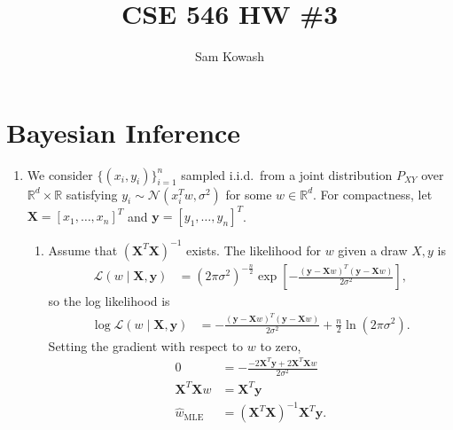 \documentclass[11pt,letterpaper]{article}
\author{Sam Kowash}
\title{CSE 546 HW \#3}
\newcommand{\R}{\mathbb{R}}
\theoremstyle{definition}
\theoremstyle{plain}
\renewcommand{\vec}[1]{\bm{#1}}
\numberwithin{equation}{section}
\numberwithin{figure}{section}
\begin{document}
\maketitle

\section{Bayesian Inference}
\begin{enumerate}
	\item We consider $\{(x_i,y_i)\}_{i=1}^n$ sampled i.i.d.\ from a joint distribution $P_{XY}$ over $\R^d \times \R$ satisfying ${y_i \sim \mathcal{N}(x_i^T w, \sigma^2)}$ for some $w \in \R^d$. For compactness, let $\vec{X} = [x_1,\ldots,x_n]^T$ and $\vec{y} = [y_1,\ldots,y_n]^T$.

	\begin{enumerate}
		\item Assume that $(\vec{X}^T \vec{X})^{-1}$ exists. The likelihood for $w$ given a draw $X,y$ is
		\begin{align*}
			\mathcal{L}(w \mid \vec{X},\vec{y}) &= \left(2\pi\sigma^2\right)^{-\frac{n}{2}} \exp\left[-\frac{(\vec{y}-\vec{X}w)^T (\vec{y}-\vec{X}w)}{2\sigma^2}\right],
		\end{align*}
		so the log likelihood is
		\begin{align*}
			\log \mathcal{L}(w \mid \vec{X},\vec{y}) &= -\frac{(\vec{y}-\vec{X}w)^T (\vec{y}-\vec{X}w)}{2\sigma^2} + \frac{n}{2} \ln (2\pi \sigma^2).
		\end{align*}
		Setting the gradient with respect to $w$ to zero,
		\begin{align*}
			0 &= -\frac{-2 \vec{X}^T \vec{y} + 2 \vec{X}^T \vec{X} w}{2\sigma^2}\\
			\vec{X}^T \vec{X} w &= \vec{X}^T \vec{y}\\
			\hat{w}_\mathrm{MLE} &= (\vec{X}^T \vec{X})^{-1} \vec{X}^T \vec{y}.
		\end{align*}




\end{enumerate}
\end{enumerate}
\end{document}
